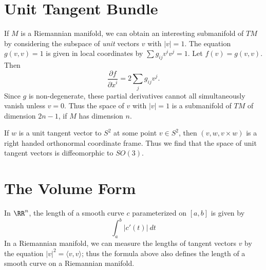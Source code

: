 \section{Unit Tangent Bundle}

If $M$ is a Riemannian manifold, we can obtain an interesting submanifold of $TM$ by considering the subspace of {\it unit} vectors $v$ with $|v| = 1$. The equation $g(v,v) = 1$ is given in local coordinates by $\sum g_{ij} v^i v^j = 1$. Let $f(v) = g(v,v)$. Then
%
\[ \frac{\partial f}{\partial \dot{x}^i} = 2 \sum_j g_{ij} v^j. \]
%
Since $g$ is non-degenerate, these partial derivatives cannot all simultaneously vanish unless $v = 0$. Thus the space of $v$ with $|v| = 1$ is a submanifold of $TM$ of dimension $2n - 1$, if $M$ has dimension $n$.

\begin{example}
    If $w$ is a unit tangent vector to $S^2$ at some point $v \in S^2$, then $(v,w,v \times w)$ is a right handed orthonormal coordinate frame. Thus we find that the space of unit tangent vectors is diffeomorphic to $SO(3)$.
\end{example}

\section{The Volume Form}

In $\RR^n$, the length of a smooth curve $c$ parameterized on $[a,b]$ is given by
%
\[ \int_a^b |c'(t)|\ dt \]
%
In a Riemannian manifold, we can measure the lengths of tangent vectors $v$ by the equation $|v|^2 = \langle v, v \rangle$; thus the formula above also defines the length of a smooth curve on a Riemannian manifold.

